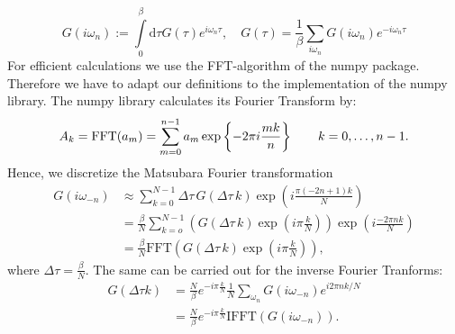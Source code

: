 \begin{appendix}
\begin{equation}
  G(i ω_n) := \int\limits_0^β \mathrm{d}τ G(τ) e^{i ω_n τ} ,
  \quad
  G(τ) = \frac{1}{β} \sum_{i ω_n} G(i ω_n) e^{-i ω_n τ}
\end{equation}
%
For efficient calculations we use the FFT-algorithm of the numpy package. Therefore we have to adapt our definitions to the implementation of the numpy library. The numpy library calculates its Fourier Transform by:
\begin{equation}
  A_k = \mathrm{FFT}(a_m) =  \sum_{m=0}^{n-1} a_m \exp\left\{-2\pi i{mk \over n}\right\}
   \qquad k = 0,\ldots,n-1.
\end{equation}
Hence, we discretize the Matsubara Fourier transformation
\begin{align}
  G(i ω_{-n}) &\approx \sum_{k=0}^{N-1} \Delta τ \, G(\Delta τ \, k) \exp{\left(i \frac{π (-2n+1)k}{N}\right)}\\
          &=\frac{\beta}{N} \sum_{k=o}^{N-1} \left( G(\Delta τ \, k)\exp{\left(i π \frac{k}{N}\right)}  \right)  \exp{\left(i \frac{-2 π n k}{N}\right)}\\
	  &= \frac{\beta}{N} \mathrm{FFT}\left( G(\Delta τ \, k)\exp{\left(i π \frac{k}{N}\right)}\right), \label{eq:MFFT}
\end{align}
where $\Delta τ = \frac{\beta}{N}$.
The same can be carried out for the inverse Fourier Tranforms:
\begin{align}
	G(\Delta τ k) &= \frac{N}{β} e^{-i π \frac{k}{N}}\frac{1}{N}\sum_{ω_n}G(i ω_{-n}) e^{i 2π n k/N}\\
	&= \frac{N}{β} e^{-i π \frac{k}{N}}\mathrm{IFFT}(G(iω_{-n})) \label{eq:IMFFT}.
\end{align}


\end{appendix}

